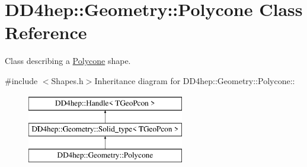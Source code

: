 \hypertarget{class_d_d4hep_1_1_geometry_1_1_polycone}{
\section{DD4hep::Geometry::Polycone Class Reference}
\label{class_d_d4hep_1_1_geometry_1_1_polycone}
}


Class describing a \hyperlink{class_d_d4hep_1_1_geometry_1_1_polycone}{Polycone} shape.  


{\ttfamily \#include $<$Shapes.h$>$}Inheritance diagram for DD4hep::Geometry::Polycone::\begin{figure}[H]
\begin{center}
\leavevmode
\includegraphics[height=3cm]{class_d_d4hep_1_1_geometry_1_1_polycone}
\end{center}
\end{figure}
